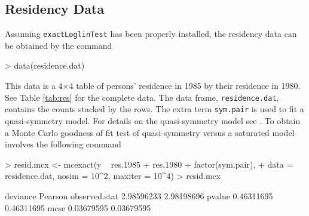 \documentclass[a4paper]{article}
\begin{document}
\subsection{Residency Data}
Assuming \texttt{exactLoglinTest} has been properly installed, the residency data can
be obtained by the command
\begin{Schunk}
\begin{Sinput}
> data(residence.dat)
\end{Sinput}
\end{Schunk}
This data is a 4$\times$4 table of persons' residence in 1985 by
their residence in 1980. See Table \ref{tab:res} for the complete
data.  The data frame, \texttt{residence.dat}, contains the counts
stacked by the rows. The extra term \texttt{sym.pair} is used to fit
a quasi-symmetry model.  For details on the quasi-symmetry model see
\cite{agre:1990}.  To obtain a Monte Carlo goodness of fit test of
quasi-symmetry versus a saturated model involves the following command
\begin{Schunk}
\begin{Sinput}
> resid.mcx <- mcexact(y ~ res.1985 + res.1980 + factor(sym.pair), 
+     data = residence.dat, nosim = 10^2, maxiter = 10^4)
> resid.mcx
\end{Sinput}
\begin{Soutput}
                deviance    Pearson
observed.stat 2.98596233 2.98198696
pvalue        0.46311695 0.46311695
mcse          0.03679595 0.03679595
\end{Soutput}
\end{Schunk}
\end{document}
